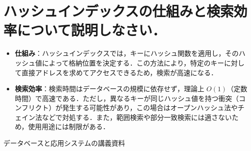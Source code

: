 \documentclass[titlepage,a4paper]{jsarticle}
\begin{document}
\section{ハッシュインデックスの仕組みと検索効率について説明しなさい．}
\begin{itemize}
  \item \textbf{仕組み}：ハッシュインデックスでは，キーにハッシュ関数を適用し，そのハッシュ値によって格納位置を決定する．この方法により，特定のキーに対して直接アドレスを求めてアクセスできるため，検索が高速になる．
  \item \textbf{検索効率}：検索時間はデータベースの規模に依存せず，理論上 $O(1)$（定数時間）で高速である．ただし，異なるキーが同じハッシュ値を持つ衝突（コンフリクト）が発生する可能性があり，この場合はオープンハッシュ法やチェイン法などで対処する．また，範囲検索や部分一致検索には適さないため，使用用途には制限がある．
\end{itemize}
\begin{thebibliography}{99}
\bibitem{}データベースと応用システムの講義資料
\end{thebibliography}
\end{document}
